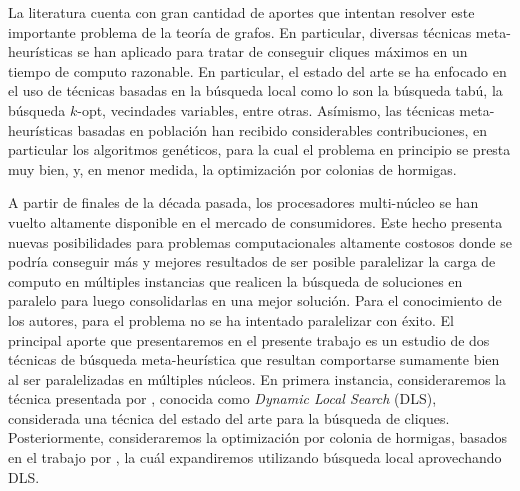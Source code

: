 \documentclass[conference]{IEEEtran}
\begin{document}
La literatura cuenta con gran cantidad de aportes que intentan
resolver este importante problema de la teoría de grafos. En
particular, diversas técnicas meta-heurísticas se han aplicado para
tratar de conseguir cliques máximos en un tiempo de computo
razonable. En particular, el estado del arte se ha enfocado en el uso
de técnicas basadas en la búsqueda local como lo son la búsqueda tabú,
la búsqueda $k$-opt, vecindades variables, entre otras. Asímismo, las
técnicas meta-heurísticas basadas en población han recibido
considerables contribuciones, en particular los algoritmos genéticos,
para la cual el problema en principio se presta muy bien, y, en menor
medida, la optimización por colonias de hormigas.

A partir de finales de la década pasada, los procesadores multi-núcleo
se han vuelto altamente disponible en el mercado de consumidores. Este
hecho presenta nuevas posibilidades para problemas computacionales
altamente costosos donde se podría conseguir más y mejores resultados
de ser posible paralelizar la carga de computo en múltiples instancias
que realicen la búsqueda de soluciones en paralelo para luego
consolidarlas en una mejor solución. Para el conocimiento de los
autores, para el problema no se ha intentado paralelizar con éxito. El
principal aporte que presentaremos en el presente trabajo es un
estudio de dos técnicas de búsqueda meta-heurística que resultan
comportarse sumamente bien al ser paralelizadas en múltiples
núcleos. En primera instancia, consideraremos la técnica presentada
por \cite{dynamicl}, conocida como \emph{Dynamic Local Search} (DLS), considerada
una técnica del estado del arte para la búsqueda de
cliques. Posteriormente, consideraremos la optimización por colonia de
hormigas, basados en el trabajo por \cite{aco1, aco2}, la cuál
expandiremos utilizando búsqueda local aprovechando DLS.

\end{document}
